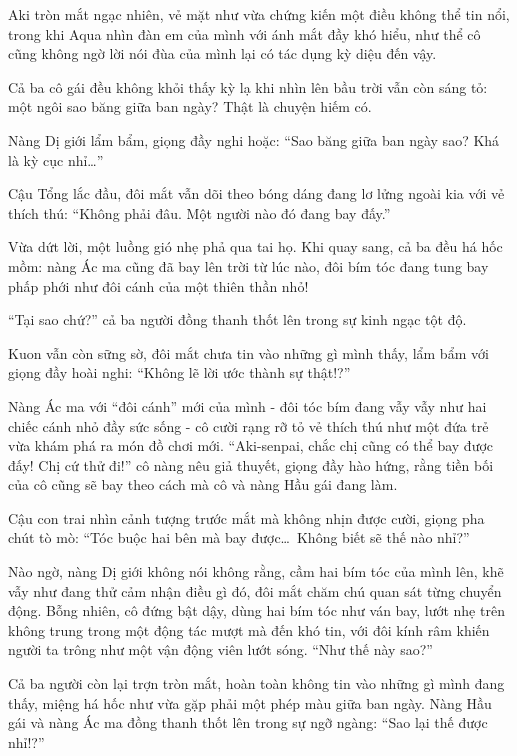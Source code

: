 \documentclass[../main.tex]{subfiles}
\begin{document}

Aki tròn mắt ngạc nhiên, vẻ mặt như vừa chứng kiến một điều không thể tin nổi, trong khi Aqua nhìn đàn em của mình với ánh mắt đầy khó hiểu, như thể cô cũng không ngờ lời nói đùa của mình lại có tác dụng kỳ diệu đến vậy.

Cả ba cô gái đều không khỏi thấy kỳ lạ khi nhìn lên bầu trời vẫn còn sáng tỏ: một ngôi sao băng giữa ban ngày? Thật là chuyện hiếm có.

Nàng Dị giới lẩm bẩm, giọng đầy nghi hoặc: ``Sao băng giữa ban ngày sao? Khá là kỳ cục nhỉ\dots''

Cậu Tổng lắc đầu, đôi mắt vẫn dõi theo bóng dáng đang lơ lửng ngoài kia với vẻ thích thú: ``Không phải đâu. Một người nào đó đang bay đấy.''

Vừa dứt lời, một luồng gió nhẹ phả qua tai họ. Khi quay sang, cả ba đều há hốc mồm: nàng Ác ma cũng đã bay lên trời từ lúc nào, đôi bím tóc đang tung bay phấp phới như đôi cánh của một thiên thần nhỏ!


``Tại sao chứ?'' cả ba người đồng thanh thốt lên trong sự kinh ngạc tột độ.

Kuon vẫn còn sững sờ, đôi mắt chưa tin vào những gì mình thấy, lẩm bẩm với giọng đầy hoài nghi: ``Không lẽ lời ước thành sự thật!?''

Nàng Ác ma với ``đôi cánh'' mới của mình - đôi tóc bím đang vẫy vẫy như hai chiếc cánh nhỏ đầy sức sống - cô cười rạng rỡ tỏ vẻ thích thú như một đứa trẻ vừa khám phá ra món đồ chơi mới. ``Aki-senpai, chắc chị cũng có thể bay được đấy! Chị cứ thử đi!'' cô nàng nêu giả thuyết, giọng đầy hào hứng, rằng tiền bối của cô cũng sẽ bay theo cách mà cô và nàng Hầu gái đang làm.

Cậu con trai nhìn cảnh tượng trước mắt mà không nhịn được cười, giọng pha chút tò mò: ``Tóc buộc hai bên mà bay được\dots\ Không biết sẽ thế nào nhỉ?''

Nào ngờ, nàng Dị giới không nói không rằng, cầm hai bím tóc của mình lên, khẽ vẫy như đang thử cảm nhận điều gì đó, đôi mắt chăm chú quan sát từng chuyển động. Bỗng nhiên, cô đứng bật dậy, dùng hai bím tóc như ván bay, lướt nhẹ trên không trung trong một động tác mượt mà đến khó tin, với đôi kính râm khiến người ta trông như một vận động viên lướt sóng. ``Như thế này sao?''


Cả ba người còn lại trợn tròn mắt, hoàn toàn không tin vào những gì mình đang thấy, miệng há hốc như vừa gặp phải một phép màu giữa ban ngày. Nàng Hầu gái và nàng Ác ma đồng thanh thốt lên trong sự ngỡ ngàng: ``Sao lại thế được nhỉ!?''
\end{document}
